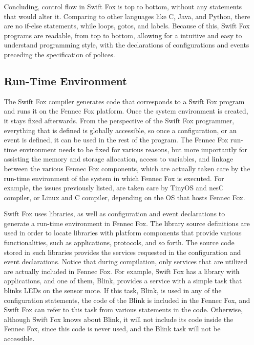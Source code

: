Concluding, control flow in Swift Fox is top to bottom, without any 
statements that would alter it. Comparing to other languages like C, Java, 
and Python, there are no if-else statements, while loops, gotos, and
labels. Because of this, Swift Fox programs are readable, from top to
bottom, allowing for a intuitive and easy to understand programming style, 
with the declarations of configurations and events preceding the
specification of polices.


\subsection{Run-Time Environment}
\label{sec:runtimeenv}

The Swift Fox compiler generates code that corresponds to a Swift Fox
program and runs it on the Fennec Fox platform. Once the system environment
is created, it stays fixed afterwards. From the perspective of the Swift
Fox programmer, everything that is defined is globally accessible, so once 
a configuration, or an event is defined, it can be used in the rest of the 
program. The Fennec Fox run-time environment needs to be fixed for various
reasons, but more importantly for assisting the memory and storage
allocation, access to variables, and linkage between the various Fennec Fox
components, which are actually taken care by the run-time environment of
the system in which Fennec Fox is executed. For example, the issues
previously listed, are taken care by TinyOS and nesC compiler, or Linux and
C compiler, depending on the OS that hosts Fennec Fox.

Swift Fox uses libraries, as well as configuration and event declarations
to generate a run-time environment in Fennec Fox. The library source
definitions are used in order to locate libraries with platform components 
that provide various functionalities, such as applications, protocols, and
so forth. The source code stored in such libraries provides the services
requested in the configuration and event declarations. Notice that during
compilation, only services that are utilized are actually included in
Fennec Fox. For example, Swift Fox has a library with applications, and one
of them, Blink, provides a service with a simple task that blinks LEDs on
the sensor mote. If this task, Blink, is used in any of the configuration 
statements, the code of the Blink is included in the Fennec Fox, and Swift 
Fox can refer to this task from various statements in the code. Otherwise, 
although Swift Fox knows about Blink, it will not include its code inside 
the Fennec Fox, since this code is never used, and the Blink task will
not be accessible.


